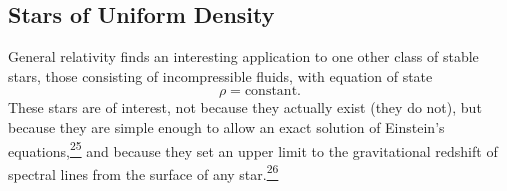 
\subsection{Stars of Uniform Density}\label{sec:11.6}

General relativity finds an interesting application to one other class of
stable stars, those consisting of incompressible fluids, with equation of
state
\begin{equation}
  \rho=\text{constant}.
  \tag{11.6.1}\label{eq:11.6.1}
\end{equation}
These stars are of interest, not because they actually exist (they do not),
but because they are simple enough to allow an exact solution of Einstein's
equations,\hyperref[ch11-ref-25]{\textsuperscript{25}} and because they set an
upper limit to the gravitational redshift of spectral lines from the surface
of any star.\hyperref[ch11-ref-26]{\textsuperscript{26}}

